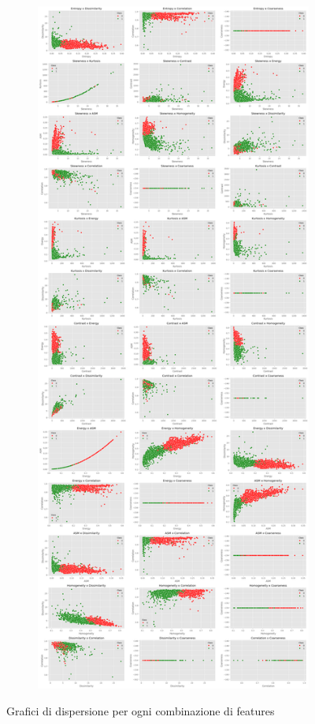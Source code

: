\begin{figure}[!ht]
\begin{subfigure}{.42\textwidth}
    \end{subfigure}
    \hfill
    \begin{subfigure}{.42\textwidth}
        \centering
        \includegraphics[width=\textwidth]{img/analisi/scatterplot_2.png}
    \end{subfigure}
    \caption{Grafici di dispersione per ogni combinazione di features}
    \label{fig:scatterplot_features}
\end{figure}